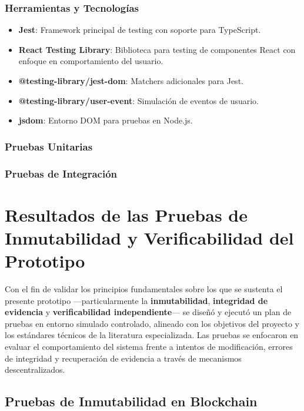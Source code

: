 \documentclass[
    letterpaper, 
    man,   
    spanish,
    12pt,
    donotrepeattitle,
    floatsintext,
    hidelinks %
]{apa7}
\begin{document}
\subsubsection{Herramientas y Tecnologías}
\begin{itemize}
    \item \textbf{Jest}: Framework principal de testing con soporte para TypeScript.
    \item \textbf{React Testing Library}: Biblioteca para testing de componentes React con enfoque en comportamiento del usuario.
    \item \textbf{@testing-library/jest-dom}: Matchers adicionales para Jest.
    \item \textbf{@testing-library/user-event}: Simulación de eventos de usuario.
    \item \textbf{jsdom}: Entorno DOM para pruebas en Node.js.
\end{itemize}

\subsubsection{Pruebas Unitarias}

\subsubsection{Pruebas de Integración}

\section{Resultados de las Pruebas de Inmutabilidad y Verificabilidad del Prototipo}

Con el fin de validar los principios fundamentales sobre los que se sustenta el presente prototipo —particularmente la \textbf{inmutabilidad}, \textbf{integridad de evidencia} y \textbf{verificabilidad independiente}— se diseñó y ejecutó un plan de pruebas en entorno simulado controlado, alineado con los objetivos del proyecto y los estándares técnicos de la literatura especializada. Las pruebas se enfocaron en evaluar el comportamiento del sistema frente a intentos de modificación, errores de integridad y recuperación de evidencia a través de mecanismos descentralizados.

\subsection{Pruebas de Inmutabilidad en Blockchain}
\end{document}
